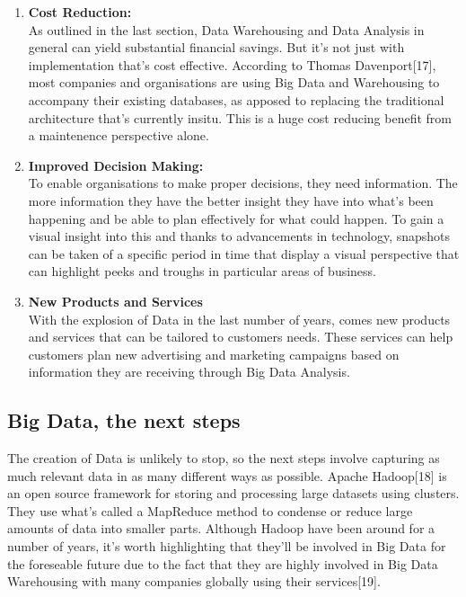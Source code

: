 \documentclass[10pt,journal,compsoc]{IEEEtran}
\begin{document}
\begin{enumerate}
	\item \textbf{Cost Reduction:}\\ As outlined in the last section, Data Warehousing  and Data Analysis in general can yield substantial financial savings. But it's not just with implementation that's cost effective. According to Thomas Davenport[17], most companies and organisations are using Big Data and Warehousing to accompany their existing databases, as apposed to replacing the traditional architecture that's currently insitu. This is a huge cost reducing benefit from a maintenence perspective alone. \\
	
	\item \textbf{Improved Decision Making:}\\ To enable organisations to make proper decisions, they need information. The more information they have the better insight they have into what's been happening and be able to plan effectively for what could happen. To gain a visual insight into this and thanks to advancements in technology, snapshots can be taken of a specific period in time that display a visual perspective that can highlight peeks and troughs in particular areas of business. \\
	
	\item \textbf{New Products and Services}\\ With the explosion of Data in the last number of years, comes new products and services that can be tailored to customers needs. These services can help customers plan new advertising and marketing campaigns based on information they are receiving through Big Data Analysis. 
	 
\end{enumerate}


\subsection{Big Data, the next steps}
The creation of Data is unlikely to stop, so the next steps involve capturing as much relevant data in as many different ways as possible. Apache Hadoop[18] is an open source framework for storing and processing large datasets using clusters. They use what's called a MapReduce method to condense or reduce large amounts of data into smaller parts. Although Hadoop have been around for a number of years, it's worth highlighting that they'll be involved in Big Data for the foreseable future due to the fact that they are highly involved in Big Data Warehousing with many companies globally using their services[19]. 
\end{document}
